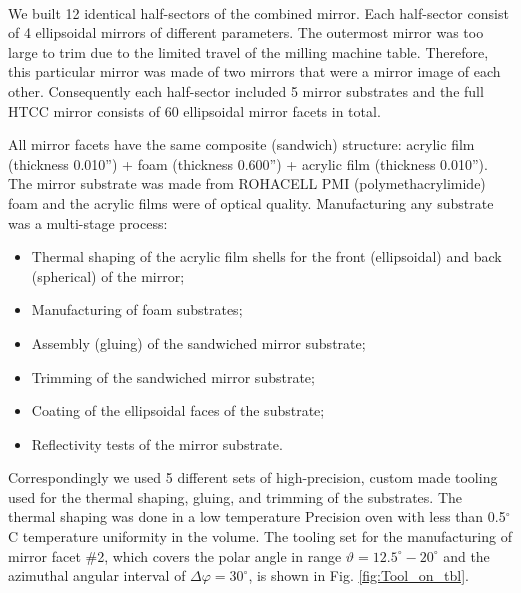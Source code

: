 \\
\indent We built 12 identical half-sectors of the combined mirror. Each half-sector consist of 4 ellipsoidal mirrors of different parameters. The outermost mirror was too large to trim due to the limited travel of the milling machine table. Therefore, this particular mirror was made of two mirrors that were a mirror image of each other. Consequently each half-sector included 5 mirror substrates and the full HTCC mirror consists of 60 ellipsoidal mirror facets in total. 

\indent All mirror facets have the same composite (sandwich) structure: acrylic film (thickness 0.010”) + foam (thickness 0.600”) + acrylic film (thickness 0.010”). The mirror substrate was made from ROHACELL PMI (polymethacrylimide) foam and the acrylic films were of optical quality. Manufacturing any substrate was a multi-stage process:
\begin{itemize}
    \item Thermal shaping of the acrylic film shells for the front (ellipsoidal) and back (spherical) of the mirror;
    \item Manufacturing of foam substrates;
    \item Assembly (gluing) of the sandwiched mirror substrate;
    \item Trimming of the sandwiched mirror substrate;
    \item Coating of the ellipsoidal faces of the substrate;
    \item Reflectivity tests of the mirror substrate.
    \end{itemize}

Correspondingly we used 5 different sets of high-precision, custom made tooling used for the thermal shaping, gluing, and trimming of the substrates. The thermal shaping was done in a low temperature Precision oven with less than  0.5$^\circ$C  temperature uniformity in the volume. The tooling set for the manufacturing of mirror facet \#2, which covers the polar angle in range
$\vartheta = 12.5^\circ - 20^\circ$ and the azimuthal angular interval of $\Delta\varphi = 30^\circ$, is shown in Fig. \ref{fig:Tool_on_tbl}.


